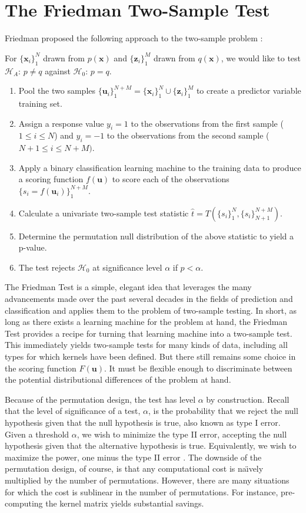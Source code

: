 \documentclass{article} %
\theoremstyle{remark}
\begin{document}
\section{The Friedman Two-Sample Test}
Friedman proposed the following approach to the two-sample problem
\cite{friedman30908multivariate}:

For $\{\mathbf{x}_i\}_1^N$ drawn from $p(\mathbf{x})$ and
$\{\mathbf{z}_i\}_1^M$ drawn from $q(\mathbf{x})$, we would like to
test $\mathcal{H}_A$: $p \neq q$ against $\mathcal{H}_0$: $p = q$.
\begin{enumerate}
\item Pool the two samples $\{\mathbf{u}_i\}_1^{N+M} =
  \{\mathbf{x}_i\}_1^{N} \cup \{\mathbf{z}_i\}_1^{M}$ to create a
  predictor variable training set. 
\item Assign a response value $y_i = 1$ to the observations from the
  first sample ($1 \leq i \leq N$) and $y_i = -1$ to the observations
  from the second sample ($N + 1 \leq i \leq N+M)$. 
\item Apply a binary classification learning machine to the training
  data to produce a scoring function $f(\mathbf{u})$ to score each of
  the observations $\{s_i = f(\mathbf{u}_i)\}_1^{N+M}$. 
\item Calculate a univariate two-sample test statistic $\hat{t} =
  T(\{s_i\}_1^N,\{s_i\}_{N+1}^{N+M})$. 
\item Determine the permutation null distribution of the above
  statistic to yield a p-value. 
\item The test rejects $\mathcal{H}_0$ at significance level $\alpha$
  if $p < \alpha$.
\end{enumerate}

The Friedman Test is a simple, elegant idea that leverages the
many advancements made over the past several decades in the fields of
prediction and classification and applies them to the problem of
two-sample testing.  In short, as long as there exists a learning
machine for the problem at hand, the Friedman Test provides a recipe
for turning that learning machine into a two-sample test.  This
immediately yields two-sample tests for many kinds of data, including
all types for which kernels have been defined.
But there still remains some choice in the scoring
function $F(\mathbf{u})$.  It must be flexible enough to discriminate
between the potential distributional differences of the problem at
hand.   

Because of the permutation design, the test has level $\alpha$ by
construction.  Recall that the level of significance of a test,
$\alpha$, is the probability that we reject the null hypothesis given
that the null hypothesis is true, also known as type I error.  Given
a threshold $\alpha$, we wish to minimize the type II error, accepting
the null hypothesis given that the alternative hypothesis is true.
Equivalently, we wish to maximize the power, one minus the type II
error \cite{lehmann2005testing}.
The downside of the permutation design, of course, is that any computational cost
is na\"\i vely multiplied by the number of permutations.  However,
there are many situations for which the cost is sublinear in the
number of permutations.  For instance, pre-computing the kernel matrix
yields substantial savings.
\end{document}
